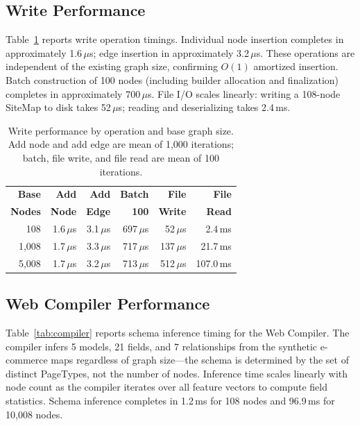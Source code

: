 \documentclass[10pt, twocolumn]{article}
\begin{document}
\subsection{Write Performance}
\label{sec:writeeval}

Table~\ref{tab:write} reports write operation timings. Individual node insertion completes in approximately 1.6\,$\mu$s; edge insertion in approximately 3.2\,$\mu$s. These operations are independent of the existing graph size, confirming $O(1)$ amortized insertion. Batch construction of 100 nodes (including builder allocation and finalization) completes in approximately 700\,$\mu$s. File I/O scales linearly: writing a 108-node SiteMap to disk takes 52\,$\mu$s; reading and deserializing takes 2.4\,ms.

\begin{table}[t]
\caption{Write performance by operation and base graph size. Add node and add edge are mean of 1{,}000 iterations; batch, file write, and file read are mean of 100 iterations.}
\label{tab:write}
\centering
\small
\begin{tabular}{@{}rrrrrr@{}}
\toprule
\textbf{Base} & \textbf{Add} & \textbf{Add} & \textbf{Batch} & \textbf{File} & \textbf{File} \\
\textbf{Nodes} & \textbf{Node} & \textbf{Edge} & \textbf{100} & \textbf{Write} & \textbf{Read} \\
\midrule
108 & 1.6\,$\mu$s & 3.1\,$\mu$s & 697\,$\mu$s & 52\,$\mu$s & 2.4\,ms \\
1{,}008 & 1.7\,$\mu$s & 3.3\,$\mu$s & 717\,$\mu$s & 137\,$\mu$s & 21.7\,ms \\
5{,}008 & 1.7\,$\mu$s & 3.2\,$\mu$s & 713\,$\mu$s & 512\,$\mu$s & 107.0\,ms \\
\bottomrule
\end{tabular}
\end{table}


\subsection{Web Compiler Performance}
\label{sec:compilereval}

Table~\ref{tab:compiler} reports schema inference timing for the Web Compiler. The compiler infers 5 models, 21 fields, and 7 relationships from the synthetic e-commerce maps regardless of graph size---the schema is determined by the set of distinct PageTypes, not the number of nodes. Inference time scales linearly with node count as the compiler iterates over all feature vectors to compute field statistics. Schema inference completes in 1.2\,ms for 108 nodes and 96.9\,ms for 10{,}008 nodes.
\end{document}
